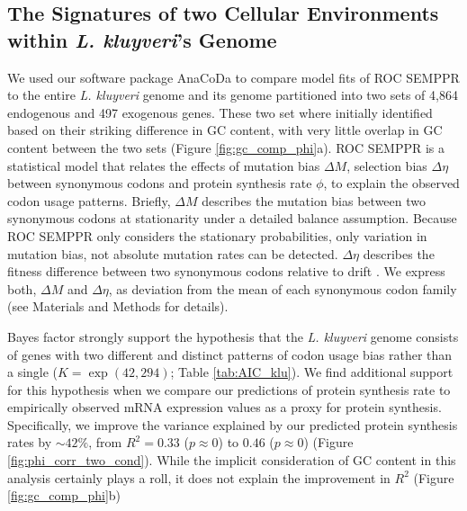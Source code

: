 \documentclass[doublespacing,linenumbers]{bmcart}
\newcommand{\kluyveri}{\textit{L. kluyveri}\xspace}
\newcommand{\ROC}{ROC SEMPPR\xspace}
\newcommand{\GC}{GC content\xspace}
\newcommand{\DM}{\ensuremath{{\Delta M}}\xspace}
\newcommand{\DE}{\ensuremath{{\Delta \eta}}\xspace}
\begin{document}
\subsection*{The Signatures of two Cellular Environments within \kluyveri's Genome}
We used our software package AnaCoDa \citep{landerer2018} to compare model fits of \ROC to the entire \kluyveri genome and its genome partitioned into two sets of 4,864 endogenous and 497 exogenous genes.
These two set where initially identified based on their striking difference in \GC \cite{payen2009}, with very little overlap in \GC between the two sets (Figure \ref{fig:gc_comp_phi}a).
\ROC is a statistical model that relates the effects of mutation bias \DM, selection bias \DE between synonymous codons and protein synthesis rate $\phi$, to explain the observed codon usage patterns.
Briefly, \DM describes the mutation bias between two synonymous codons at stationarity under a detailed balance assumption. 
Because \ROC only considers the stationary probabilities, only variation in mutation bias, not absolute mutation rates can be detected.
\DE describes the fitness difference between two synonymous codons relative to drift \citep{gilchrist2015}. 
We express both, \DM and \DE, as deviation from the mean of each synonymous codon family (see Materials and Methods for details).

Bayes factor strongly support the hypothesis that the \kluyveri genome consists of genes with two different and distinct patterns of codon usage bias rather than a single ($K = \exp(42,294)$; Table \ref{tab:AIC_klu}).
We find additional support for this hypothesis when we compare our predictions of protein synthesis rate to empirically observed mRNA expression values as a proxy for protein synthesis.
Specifically, we improve the variance explained by our predicted protein synthesis rates by $\sim 42\%$, from $R^2 = 0.33$ ($p \approx 0$) to $0.46$ ($p \approx 0$) (Figure \ref{fig:phi_corr_two_cond}).
While the implicit consideration of \GC in this analysis certainly plays a roll, it does not explain the improvement in $R^2$ (Figure \ref{fig:gc_comp_phi}b)
\end{document}
